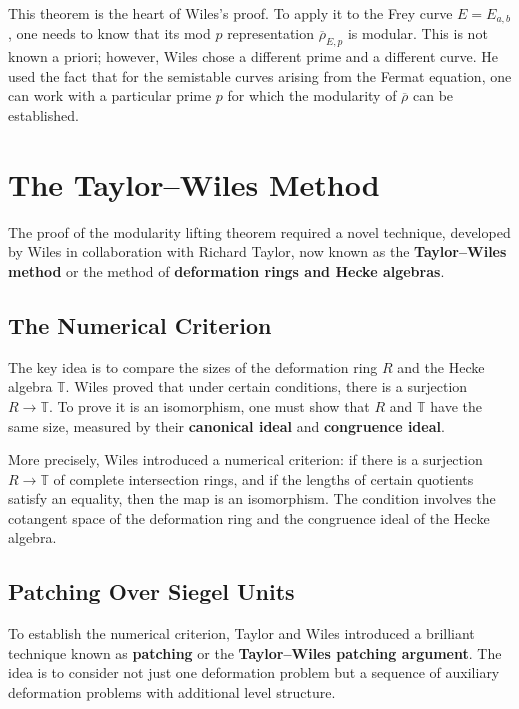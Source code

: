 This theorem is the heart of Wiles's proof. To apply it to the Frey curve \(E = E_{a,b}\), one needs to know that its mod \(p\) representation \(\overline{\rho}_{E,p}\) is modular. This is not known a priori; however, Wiles chose a different prime and a different curve. He used the fact that for the semistable curves arising from the Fermat equation, one can work with a particular prime \(p\) for which the modularity of \(\overline{\rho}\) can be established.

\section{The Taylor--Wiles Method}

The proof of the modularity lifting theorem required a novel technique, developed by Wiles in collaboration with Richard Taylor, now known as the \textbf{Taylor--Wiles method} or the method of \textbf{deformation rings and Hecke algebras}.

\subsection{The Numerical Criterion}

The key idea is to compare the sizes of the deformation ring \(R\) and the Hecke algebra \(\mathbb{T}\). Wiles proved that under certain conditions, there is a surjection \(R \to \mathbb{T}\). To prove it is an isomorphism, one must show that \(R\) and \(\mathbb{T}\) have the same size, measured by their \textbf{canonical ideal} and \textbf{congruence ideal}.

More precisely, Wiles introduced a numerical criterion: if there is a surjection \(R \to \mathbb{T}\) of complete intersection rings, and if the lengths of certain quotients satisfy an equality, then the map is an isomorphism. The condition involves the cotangent space of the deformation ring and the congruence ideal of the Hecke algebra.

\subsection{Patching Over Siegel Units}

To establish the numerical criterion, Taylor and Wiles introduced a brilliant technique known as \textbf{patching} or the \textbf{Taylor--Wiles patching argument}. The idea is to consider not just one deformation problem but a sequence of auxiliary deformation problems with additional level structure.

